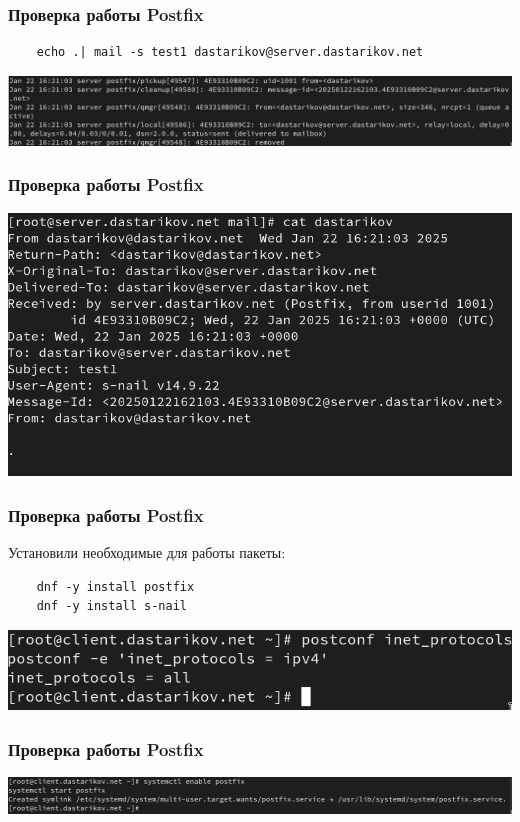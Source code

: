 \begin{frame}[containsverbatim]
\frametitle{Проверка работы Postfix}
  \begin{verbatim}
    echo .| mail -s test1 dastarikov@server.dastarikov.net
  \end{verbatim}
    \centering
    \includegraphics[width=\textwidth]{../images/image11.png}
\end{frame}
\begin{frame}
\frametitle{Проверка работы Postfix}
    \centering
    \includegraphics[width=\textwidth]{../images/image12.png}
\end{frame}
\begin{frame}[containsverbatim]
\frametitle{Проверка работы Postfix}
Установили необходимые для работы пакеты:
  \begin{verbatim}
    dnf -y install postfix
    dnf -y install s-nail
  \end{verbatim}
    \centering
    \includegraphics[width=\textwidth]{../images/image13.png}
\end{frame}
\begin{frame}
\frametitle{Проверка работы Postfix}
    \centering
    \includegraphics[width=\textwidth]{../images/image14.png}
\end{frame}
